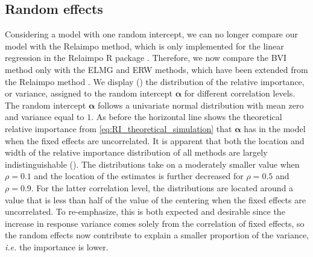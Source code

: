 \subsection{Random effects}
\label{sec:relimp_random}
Considering a model with one random intercept, we can no longer compare our model with the Relaimpo method, which is only implemented for the linear regression in the Relaimpo R package \citep{gromping_relaimpo}. Therefore, we now compare the BVI method only with the ELMG and ERW methods, which have been extended from the Relaimpo method \citep{matre}.
We display () the distribution of the relative importance, or variance, assigned to the random intercept $\boldsymbol{\alpha}$ for different correlation levels. 
The random intercept $\boldsymbol{\alpha}$ follows a univariate normal distribution with mean zero and variance equal to $1$.
As before the horizontal line shows the theoretical relative importance from \eqref{eq:RI_theoretical_simulation} that $\boldsymbol{\alpha}$ has in the model when the fixed effects are uncorrelated.
\newline
\newline
It is apparent that both the location and width of the relative importance distribution of all methods are largely indistinguishable (). 
The distributions take on a moderately smaller value when $\rho=0.1$ and the location of the estimates is further decreased for $\rho=0.5$ and $\rho=0.9$. 
For the latter correlation level, the distributions are located around a value that is less than half of the value of the centering when the fixed effects are uncorrelated. 
To re-emphasize, this is both expected and desirable since the increase in response variance comes solely from the correlation of fixed effects, so the random effects now contribute to explain a smaller proportion of the variance, \textit{i.e.} the importance is lower.
